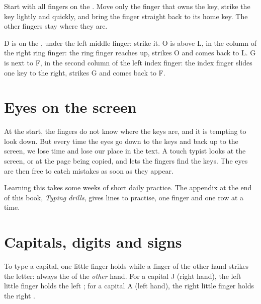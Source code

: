 \begin{method}\label{met:g3:typing-with-ten-fingers:strike}
Start with all fingers on the . Move only the finger that owns the key,
strike the key lightly and quickly, and bring the finger straight back to its
home key. The other fingers stay where they are.
\end{method}

\begin{example}\label{ex:g3:typing-with-ten-fingers:dog}
D is on the , under the left middle finger: strike it. O is above L,
in the column of the right ring finger: the ring finger reaches up, strikes O
and comes back to L. G is next to F, in the second column of the left index
finger: the index finger slides one key to the right, strikes G and comes back
to F.
\end{example}

\section{Eyes on the screen}

At the start, the fingers do not know where the keys are, and it is tempting
to look down. But every time the eyes go down to the keys and back up to the
screen, we lose time and lose our place in the text. A touch typist looks at
the screen, or at the page being copied, and lets the fingers find the keys.
The eyes are then free to catch mistakes as soon as they appear.

Learning this takes some weeks of short daily practice. The appendix at the end
of this book, \emph{Typing drills}, gives lines to practise, one finger and one
row at a time.

\section{Capitals, digits and signs}

To type a capital, one little finger holds  while a finger of the
other hand strikes the letter: always the  of the \emph{other} hand.
For a capital J (right hand), the left little finger holds the left
; for a capital A (left hand), the right little finger holds the
right .

